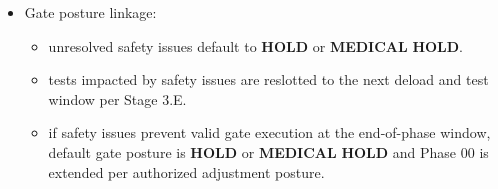 \documentclass[10pt]{article}
\begin{document}
\begin{itemize}
\begin{itemize}
  \item \textbf{WATER} codes are expected N/A in Phase 00; they exist for breach documentation only. Any use indicates a major violation and triggers \textbf{MEDICAL} \textbf{HOLD} posture for aquatic progression governance.
  \end{itemize}
\item Gate posture linkage:
  \begin{itemize}
  \item unresolved safety issues default to \textbf{HOLD} or \textbf{MEDICAL} \textbf{HOLD}.
  \item tests impacted by safety issues are reslotted to the next deload and test window per Stage 3.E.
  \item if safety issues prevent valid gate execution at the end-of-phase window, default gate posture is \textbf{HOLD} or \textbf{MEDICAL} \textbf{HOLD} and Phase 00 is extended per authorized adjustment posture.
  \end{itemize}
\end{itemize}
\end{document}
